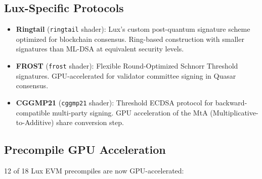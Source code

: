\documentclass[11pt]{article}
\begin{document}
\subsection{Lux-Specific Protocols}

\begin{itemize}
\item \textbf{Ringtail} (\texttt{ringtail} shader): Lux's custom post-quantum signature
      scheme optimized for blockchain consensus. Ring-based construction with smaller
      signatures than ML-DSA at equivalent security levels.

\item \textbf{FROST} (\texttt{frost} shader): Flexible Round-Optimized Schnorr Threshold
      signatures. GPU-accelerated for validator committee signing in Quasar consensus.

\item \textbf{CGGMP21} (\texttt{cggmp21} shader): Threshold ECDSA protocol for
      backward-compatible multi-party signing. GPU acceleration of the MtA
      (Multiplicative-to-Additive) share conversion step.
\end{itemize}

\subsection{Precompile GPU Acceleration}

12 of 18 Lux EVM precompiles are now GPU-accelerated:
\end{document}
